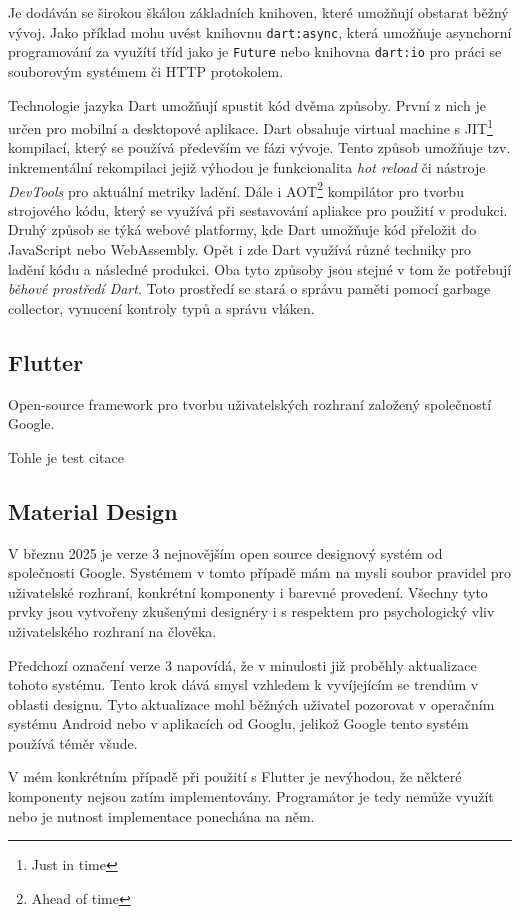 \documentclass[
  biblatex,
  figures=false,
  tables=false,
  glossaries,
  index
]{kidiplom}
\begin{document}
Je dodáván se širokou škálou základních knihoven, které umožňují obstarat běžný vývoj. Jako příklad mohu uvést knihovnu \verb|dart:async|, která umožňuje asynchorní programování za využítí tříd jako je \verb|Future| nebo knihovna \verb|dart:io| pro práci se souborovým systémem či HTTP protokolem.

Technologie jazyka Dart umožňují spustit kód dvěma způsoby. První z nich je určen pro mobilní a desktopové aplikace. Dart obsahuje virtual machine s JIT\footnote{Just in time} kompilací, který se používá především ve fázi vývoje. Tento způsob umožňuje tzv. inkrementální rekompilaci jejiž výhodou je funkcionalita \textit{hot reload} či nástroje \textit{DevTools} pro aktuální metriky ladění. Dále i AOT\footnote{Ahead of time} kompilátor pro tvorbu strojového kódu, který se využívá při sestavování apliakce pro použití v produkci. Druhý způsob se týká webové platformy, kde Dart umožňuje kód přeložit do JavaScript nebo WebAssembly. Opět i zde Dart využívá různé techniky pro ladění kódu a následné produkci. Oba tyto způsoby jsou stejné v tom že potřebují \textit{běhové prostředí Dart}. Toto prostředí se stará o správu paměti pomocí garbage collector, vynucení kontroly typů a správu vláken.


\subsection{Flutter}
Open-source framework pro tvorbu uživatelských rozhraní založený společností Google. 

Tohle je test citace \cite{flutter}

\subsection{Material Design}
V březnu 2025 je verze 3 nejnovějším open source designový systém od společnosti Google. Systémem v tomto případě mám na mysli soubor pravidel pro uživatelské rozhraní, konkrétní komponenty i barevné provedení. Všechny tyto prvky jsou vytvořeny zkušenými designéry i s respektem pro psychologický vliv uživatelského rozhraní na člověka.

Předchozí označení verze 3 napovídá, že v minulosti již proběhly aktualizace tohoto systému. Tento krok dává smysl vzhledem k vyvíjejícím se trendům v oblasti designu. Tyto aktualizace mohl běžných uživatel pozorovat v operačním systému Android nebo v aplikacích od Googlu, jelikož Google tento systém používá téměr všude.

V mém konkrétním případě při použití s Flutter je nevýhodou, že některé komponenty nejsou zatím implementovány. Programátor je tedy nemůže využít nebo je nutnost implementace ponechána na něm.
\end{document}
